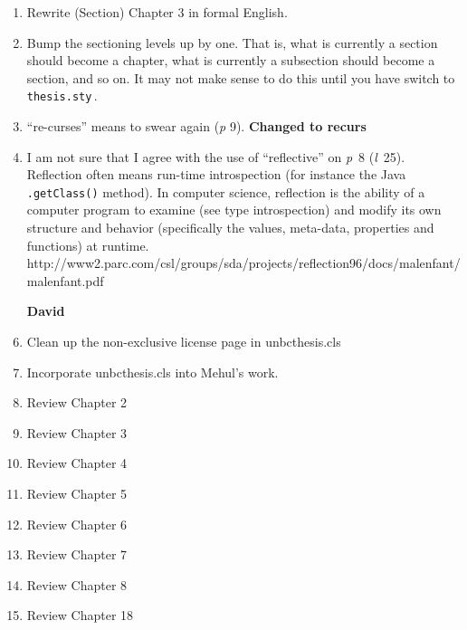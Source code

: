 \begin{scope}
\begin{enumerate}
  The \Verb!\paragraph! command is in the same family as \Verb!chapter!,
  \Verb!\section!, and so on.  For its correct use, see later in this
  file.

  If you don't like the shape of the paragraphs that you get without
  \Verb!paragraph!, use something like
  \begin{Verbatim}
\setlength{\parindent}{3em}
\setlength{\parskip}{2\baselineskip}
  \end{Verbatim}
  to adjust either the initial paragraph indent, or the inter-paragraph
  space.

\item
  Rewrite (Section) Chapter 3 in formal English.

\item
  Bump the sectioning levels up by one.  That is, what is currently a
  section should become a chapter, what is currently a subsection should
  become a section, and so on.  It may not make sense to do this until
  you have switch to \Verb!thesis.sty!\,.

\item
  ``re-curses'' means to swear again (\textit{p} 9). \textbf{Changed to recurs}
\item
  I am not sure that I agree with the use of ``reflective'' on
  \textit{p}~8 (\textit{l}~25).  Reflection often means run-time
  introspection (for instance the Java \Verb!.getClass()! method).
  In computer science, reflection is the ability of a computer program to examine (see type introspection) and modify its own structure and behavior (specifically the values, meta-data, properties and functions) at runtime.
  http://www2.parc.com/csl/groups/sda/projects/reflection96/docs/malenfant/malenfant.pdf 
  
\item [\textbf{David}]
\item Clean up the non-exclusive license page in unbcthesis.cls
\item Incorporate unbcthesis.cls into Mehul's work.
\item Review Chapter 2
\item Review Chapter 3
\item Review Chapter 4
\item Review Chapter 5
\item Review Chapter 6
\item Review Chapter 7
\item Review Chapter 8
\item Review Chapter 18


\end{enumerate}
\end{scope}
